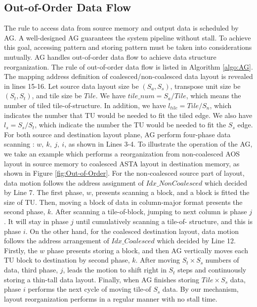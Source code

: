 \documentclass[10pt,journal,compsoc]{IEEEtran}
\begin{document}
\subsection{Out-of-Order Data Flow}
The rule to access data from source memory and output data is scheduled by AG.
A well-designed AG guarantees the system pipeline without stall.
To achieve this goal, accessing pattern and storing pattern must be taken into considerations mutually.
AG handles out-of-order data flow to achieve data structure reorganization.
The rule of out-of-order data flow is listed in Algorithm \ref{algo:AG}. The mapping address definition of coalesced/non-coalesced data layout is revealed in lines 15-16.
Let source data layout size be $ (S_{a}, S_{s}) $, transpose unit size be $ (S_{t}, S_{t}) $, and tile size be $  Tile  $.  We have $ tile\_num = S_{a}/Tile $, which means the number of tiled tile-of-structure. In addition, we have $ l_{tile}=Tile/S_{n} $, which indicates the number that TU would be needed to fit the tiled edge.   We also have $ l_{s}= S_{s}/S_{t} $, which indicate the number the TU would be needed to fit the $  S_{s}  $ edge.
For both source and destination layout plane, AG perform four-phase data scanning : $ w,\ k,\ j,\ i $, as shown in Lines 3-4.
To illustrate the operation of the AG, we take an example which performs a reorganization from non-coalesced AOS layout in source memory to coalesced ASTA layout in destination memory, as shown in Figure \ref{fig:Out-of-Order}.
For the non-coalesced source part of layout, data motion follows the address assignment of $ Idx\_NonCoalesced $ which decided by Line 7.
The first phase, $ w $, presents scanning a block, and a block is fitted the size of TU. Then, moving a block of data in column-major format presents the second phase, $ k $.
After scanning a tile-of-block, jumping to next column is phase $ j $.
It will stay in phase $ j $ until cumulatively scanning a tile-of- structure, and this is phase $ i $.
On the other hand, for the coalesced destination layout, data motion follows the address arrangement of $ Idx\_Coalesced $ which decided by Line 12. Firstly, the $ w $ phase presents storing a block, and  then AG vertically moves each TU block to destination by second phase, $ k $. After moving $S_{t}\times S_{s}$ numbers of data, third phase, $ j $, leads the motion to shift right in $S_{t}$ steps and continuously storing a thin-tall data layout. Finally, when AG finishes storing $Tile\times S_{s}$ data, phase $ i $ performs the next cycle of moving tile-of $S_{s}$ data.
By our mechanism, layout reorganization performs in a regular manner with no stall time.
\end{document}
